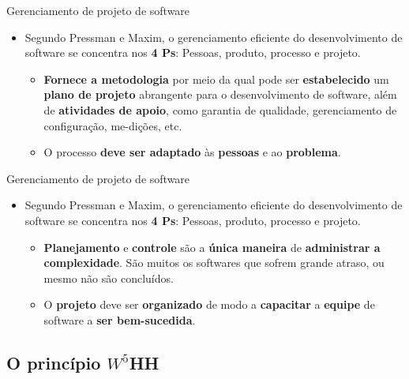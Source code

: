 \documentclass{beamer}
\begin{document}
\begin{frame}{Gerenciamento de projeto de software}
	\begin{itemize}
		\justifying
		\item Segundo Pressman e Maxim, o \alert<2>{gerenciamento} eficiente do desenvolvimento de software se concentra nos \textbf{4 Ps}: Pessoas, produto, \alert<1-2>{processo} e projeto.
		\begin{itemize}
			\justifying
			\item<1> \textbf{Fornece a metodologia} por meio da qual pode ser \textbf{estabelecido} um \textbf{plano de projeto} abrangente para o desenvolvimento de software, além de \textbf{atividades de apoio}, como garantia de qualidade, gerenciamento de configuração, me-dições, etc.
			\item<2> O processo \textbf{deve ser adaptado} às \textbf{pessoas} e ao \textbf{problema}.
		\end{itemize}
	\end{itemize}
\end{frame}

\begin{frame}{Gerenciamento de projeto de software}
	\begin{itemize}
		\justifying
		\item Segundo Pressman e Maxim, o \alert<2>{gerenciamento} eficiente do desenvolvimento de software se concentra nos \textbf{4 Ps}: Pessoas, produto, processo e \alert<1-2>{projeto}.
		\begin{itemize}
			\justifying
			\item<1> \textbf{Planejamento} e \textbf{controle} são a \textbf{única maneira} de \textbf{administrar a complexidade}. São muitos os softwares que sofrem grande atraso, ou mesmo não são concluídos.
			\item<2> O \textbf{projeto}  deve ser \textbf{organizado} de modo a \textbf{capacitar} a \textbf{equipe} de software a \textbf{ser bem-sucedida}.
		\end{itemize}
	\end{itemize}
\end{frame}

\subsection{O princípio $W^{5}$HH}
\end{document}
